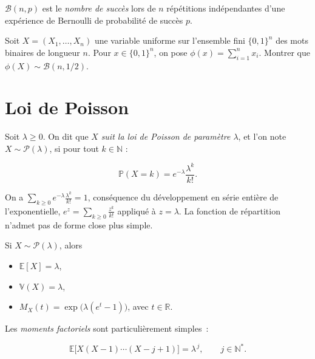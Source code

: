\begin{remarque}[Interprétation]
$\mathcal{B}(n,p)$ est le \textit{nombre de succès} lors de $n$ répétitions indépendantes d'une expérience de Bernoulli de probabilité de succès $p$.
\end{remarque}

\begin{exercice}
Soit $X=(X_1,\dots,X_n)$ une variable uniforme sur l'ensemble fini $\{0,1\}^n$ des mots binaires de longueur $n$. Pour $x\in\{0,1\}^n$, on pose $\phi(x)=\sum_{i=1}^n x_i$. Montrer que $\phi(X)\sim\mathcal{B}(n,1/2)$.
\end{exercice}

\newpage

\section{Loi de Poisson}

\medskip
\begin{mdframed}
\begin{definition}
Soit $\lambda\ge0$. On dit que $X$ \emph{suit la loi de Poisson de paramètre $\lambda$}, et l'on note $X\sim\mathcal{P}(\lambda)$, si pour tout $k\in\mathbb{N}$ :

$$
  \mathbb{P}(X=k)=e^{-\lambda}\frac{\lambda^k}{k!}.
$$
\end{definition}
\end{mdframed}

\medskip

\begin{mdframed}
\begin{proposition}
On a $\sum_{k\ge0}e^{-\lambda}\frac{\lambda^k}{k!}=1$, conséquence du développement en série entière de l'exponentielle, $e^{z}=\sum_{k\ge0}\frac{z^k}{k!}$ appliqué à $z=\lambda$. La fonction de répartition n'admet pas de forme close plus simple.
\end{proposition}
\end{mdframed}

\medskip

\begin{mdframed}
\begin{proposition}
Si $X\sim\mathcal{P}(\lambda)$, alors

\begin{itemize}
\item $\mathbb{E}[X]=\lambda$,
\item $\mathbb{V}(X)=\lambda$, 
\item $M_X(t)=\exp\!\big(\lambda(e^t-1)\big)$, avec $t\in\mathbb{R}$.
\end{itemize}

Les \emph{moments factoriels} sont particulièrement simples~:

$$
  \mathbb{E}\big[X(X-1)\cdots(X-j+1)\big]=\lambda^{\,j},\qquad j\in\mathbb{N}^*.
$$
\end{proposition}
\end{mdframed}

